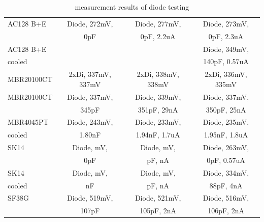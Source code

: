 \begin{table}[H]
\begin{center}
\begin{tabular}{| l | c | c | c |}
    \hline
AC128 B+E  & Diode, 272mV,        & Diode, 277mV,              & Diode, 273mV,             \\
           &               0pF    &               0pF, 2.2uA   &               0pF, 2.3uA  \\
    \hline
AC128 B+E  &                      &                     & Diode, 349mV,               \\
cooled     &                      &                     &               140pF, 0.57uA \\
    \hline
MBR20100CT & 2xDi, 337mV, 337mV   & 2xDi, 338mV, 338mV  & 2xDi, 336mV, 335mV  \\
    \hline
MBR20100CT & Diode, 337mV,        & Diode, 339mV,             & Diode, 337mV,            \\
           &               345pF  &               351pF, 29nA &               350pF, 25nA\\
    \hline
MBR4045PT  & Diode, 243mV,        & Diode, 233mV,               & Diode, 235mV,              \\
cooled     &               1.80nF &               1.94nF, 1.7uA &               1.95nF, 1.8uA\\
    \hline
SK14       & Diode,    mV,        & Diode,    mV,               & Diode, 263mV,              \\
           &                  0pF &                   pF,    nA &               0pF, 0.57uA\\
    \hline
SK14       & Diode,    mV,        & Diode,    mV,               & Diode, 334mV,              \\
cooled     &                   nF &                   pF,    nA &               88pF, 4nA\\
    \hline
SF38G      & Diode, 519mV,        & Diode, 521mV,            & Diode, 516mV,            \\
           &               107pF  &               105pF, 2nA &               106pF, 2nA \\
    \hline
    \end{tabular}
  \end{center}
  \caption{measurement results of diode testing}
  \label{tab:diodes} 
\end{table}

